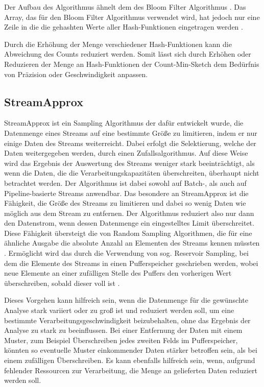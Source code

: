 Der Aufbau des Algorithmus ähnelt dem des Bloom Filter Algorithmus \cite{cormode2017}. 
Das Array, das für den Bloom Filter Algorithmus verwendet wird, 
hat jedoch nur eine Zeile in die die gehashten Werte aller Hash-Funktionen eingetragen werden \cite{cormode2017}.

Durch die Erhöhung der Menge verschiedener Hash-Funktionen kann die Abweichung des Counts reduziert werden. 
Somit lässt sich durch Erhöhen oder Reduzieren der Menge an Hash-Funktionen 
der Count-Min-Sketch dem Bedürfnis von Präzision oder Geschwindigkeit anpassen.

\subsection{StreamApprox}

StreamApprox ist ein Sampling Algorithmus der dafür entwickelt wurde, 
die Datenmenge eines Streams auf eine bestimmte Größe zu limitieren, 
indem er nur einige Daten des Streams weiterreicht. 
Dabei erfolgt die Selektierung, welche der Daten weitergegeben werden, durch einen Zufallsalgorithmus. 
Auf diese Weise wird das Ergebnis der Auswertung des Streams weniger stark beeinträchtigt, 
als wenn die Daten, die die Verarbeitungskapazitäten überschreiten, 
überhaupt nicht betrachtet werden. 
Der Algorithmus ist dabei sowohl auf Batch-, als auch auf Pipeline-basierte Streams anwendbar.
Das besondere an StreamApprox ist die Fähigkeit, 
die Größe des Streams zu limitieren und dabei so wenig Daten wie möglich aus dem Stream zu entfernen. 
Der Algorithmus reduziert also nur dann den Datenstrom, wenn dessen Datenmenge ein eingestelltes Limit überschreitet. 
Diese Fähigkeit übersteigt die von Random Sampling Algorithmen, 
die für eine ähnliche Ausgabe die absolute Anzahl an Elementen des Streams kennen müssten \cite{quoc2017}. 
Ermöglicht wird das durch die Verwendung von sog. Reservoir Sampling, 
bei dem die Elemente des Streams in einen Pufferspeicher geschrieben werden, 
wobei neue Elemente an einer zufälligen Stelle des Puffers den vorherigen Wert überschreiben, sobald dieser voll ist \cite{quoc2017}. 

Dieses Vorgehen kann hilfreich sein, 
wenn die Datenmenge für die gewünschte Analyse stark variiert oder zu groß ist und reduziert werden soll, 
um eine bestimmte Verarbeitungsgeschwindigkeit beizubehalten, 
ohne das Ergebnis der Analyse zu stark zu beeinflussen.
Bei einer Entfernung der Daten mit einem Muster, zum Beispiel Überschreiben jedes zweiten Felds im Pufferspeicher, 
könnten so eventuelle Muster einkommender Daten stärker betroffen sein, als bei einem zufälligen Überschreiben.
Es kann ebenfalls hilfreich sein, 
wenn, aufgrund fehlender Ressourcen zur Verarbeitung, 
die Menge an gelieferten Daten reduziert werden soll.
